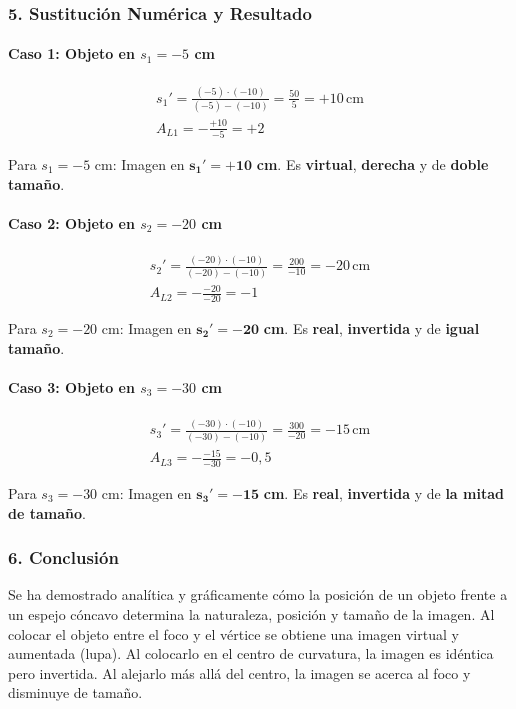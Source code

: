 \subsubsection*{5. Sustitución Numérica y Resultado}
\paragraph*{Caso 1: Objeto en $s_1 = -5$ cm}
\begin{gather}
    s_1' = \frac{(-5) \cdot (-10)}{(-5) - (-10)} = \frac{50}{5} = +10 \, \text{cm} \\
    A_{L1} = -\frac{+10}{-5} = +2
\end{gather}
\begin{cajaresultado}
    Para $s_1=-5$ cm: Imagen en $\boldsymbol{s_1'=+10}$ \textbf{cm}. Es \textbf{virtual}, \textbf{derecha} y de \textbf{doble tamaño}.
\end{cajaresultado}

\paragraph*{Caso 2: Objeto en $s_2 = -20$ cm}
\begin{gather}
    s_2' = \frac{(-20) \cdot (-10)}{(-20) - (-10)} = \frac{200}{-10} = -20 \, \text{cm} \\
    A_{L2} = -\frac{-20}{-20} = -1
\end{gather}
\begin{cajaresultado}
    Para $s_2=-20$ cm: Imagen en $\boldsymbol{s_2'=-20}$ \textbf{cm}. Es \textbf{real}, \textbf{invertida} y de \textbf{igual tamaño}.
\end{cajaresultado}

\paragraph*{Caso 3: Objeto en $s_3 = -30$ cm}
\begin{gather}
    s_3' = \frac{(-30) \cdot (-10)}{(-30) - (-10)} = \frac{300}{-20} = -15 \, \text{cm} \\
    A_{L3} = -\frac{-15}{-30} = -0,5
\end{gather}
\begin{cajaresultado}
    Para $s_3=-30$ cm: Imagen en $\boldsymbol{s_3'=-15}$ \textbf{cm}. Es \textbf{real}, \textbf{invertida} y de \textbf{la mitad de tamaño}.
\end{cajaresultado}

\subsubsection*{6. Conclusión}
\begin{cajaconclusion}
Se ha demostrado analítica y gráficamente cómo la posición de un objeto frente a un espejo cóncavo determina la naturaleza, posición y tamaño de la imagen. Al colocar el objeto entre el foco y el vértice se obtiene una imagen virtual y aumentada (lupa). Al colocarlo en el centro de curvatura, la imagen es idéntica pero invertida. Al alejarlo más allá del centro, la imagen se acerca al foco y disminuye de tamaño.
\end{cajaconclusion}

